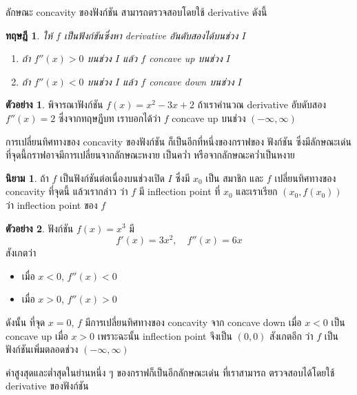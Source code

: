 \documentclass[
]{book}
\newtheorem{theorem}{ทฤษฎี}[chapter]
\theoremstyle{definition}
\newtheorem{definition}{นิยาม}[chapter]
\theoremstyle{definition}
\newtheorem{example}{ตัวอย่าง}[chapter]
\theoremstyle{definition}
\theoremstyle{definition}
\theoremstyle{remark}
\begin{document}
ลักษณะ concavity ของฟังก์ชัน สามารถตรวจสอบโดยใช้ derivative ดังนี้

\begin{theorem}

ให้ \(f\) เป็นฟังก์ชันซึ่งหา derivative อันดับสองได้บนช่วง \(I\)

\begin{enumerate}
\def\labelenumi{\arabic{enumi}.}
\item
  ถ้า \(f''(x) > 0\) บนช่วง \(I\) แล้ว \(f\) concave up บนช่วง \(I\)
\item
  ถ้า \(f''(x) < 0\) บนช่วง \(I\) แล้ว \(f\) concave down บนช่วง \(I\)
\end{enumerate}

\end{theorem}

\begin{example}
พิจารณาฟังก์ชัน \(f(x) = x^2-3x+2\) ถ้าเราคำนวณ derivative อับดับสอง \(f''(x) = 2\)
ซึ่งจากทฤษฏีบท เราบอกได้ว่า \(f\) concave up บนช่วง \((-\infty,\infty)\)
\end{example}

การเปลี่ยนทิศทางของ concavity ของฟังก์ชัน ก็เป็นอีกที่หนึ่งของกราฟของ ฟังก์ชัน
ซึ่งมีลักษณะเด่น ที่จุดนี้กราฟอาจมีการเปลี่ยนจากลักษณะหงาย เป็นคว่ำ
หรือจากลักษณะคว่ำเป็นหงาย

\begin{definition}
ถ้า \(f\) เป็นฟังก์ชันต่อเนื่องบนช่วงเปิด \(I\) ซึ่งมี \(x_0\) เป็น สมาชิก และ \(f\)
เปลี่ยนทิศทางของ concavity ที่จุดนี้ แล้วเรากล่าว ว่า \(f\) มี inflection point ที่
\(x_0\) และเราเรียก \((x_0,f(x_0))\) ว่า inflection point ของ \(f\)
\end{definition}

\begin{example}
ฟังก์ชัน \(f(x) = x^3\) มี \[f'(x) = 3x^2, \quad f''(x) = 6x\] สังเกตว่า

\begin{itemize}
\item
  เมื่อ \(x<0\), \(f''(x) < 0\)
\item
  เมื่อ \(x>0\), \(f''(x) >0\)
\end{itemize}

ดังนั้น ที่จุด \(x=0\), \(f\) มีการเปลี่ยนทิศทางของ concavity จาก concave down เมื่อ
\(x<0\) เป็น concave up เมื่อ \(x>0\) เพราะฉะนั้น inflection point จึงเป็น \((0,0)\)
สังเกตอีก ว่า \(f\) เป็นฟังก์ชันเพิ่มตลอดช่วง \((-\infty,\infty)\)
\end{example}

ค่าสูงสุดและต่ำสุดในย่านหนึ่ง ๆ ของกราฟก็เป็นอีกลักษณะเด่น ที่เราสามารถ ตรวจสอบได้โดยใช้
derivative ของฟังก์ชัน
\end{document}
